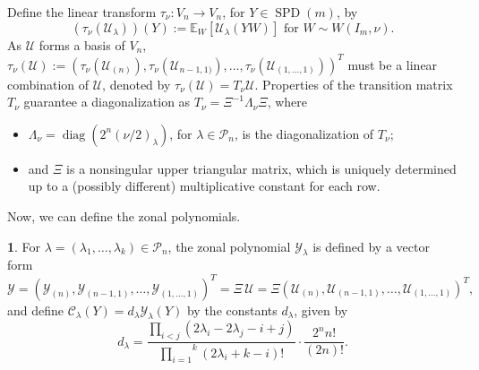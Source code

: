 \documentclass{mathincs}
\numberwithin{equation}{section}
\numberwithin{figure}{section}
\theoremstyle{plain}
\theoremstyle{definition}
\newtheorem{defn}[thm]{\protect\definitionname}
\theoremstyle{remark}
\theoremstyle{plain}
\theoremstyle{definition}
\theoremstyle{plain}
\theoremstyle{plain}
\DeclareMathOperator{\diag}{diag}
\newcommand{\SPD}{\operatorname{SPD}}
\providecommand{\definitionname}{Definition}
\begin{document}
\noindent
Define the linear transform $\tau_{\nu}\colon V_{n}\longrightarrow V_{n}$,
for $Y\in \SPD(m)$, by
\[
  (\tau_{\nu}(\mathcal{U}_{\lambda}))(Y) :=
  \mathbb{E}_{W}[\mathcal{U}_{\lambda}(YW)]\text{ for }W\sim W(I_m,\nu).
\]
As $\mathcal{U}$ forms a basis of $V_{n}$, $\tau_{\nu}(\mathcal{U}):=\left(\tau_{\nu}(\mathcal{U}_{(n)}),\tau_{\nu}(\mathcal{U}_{n-1,1)}),\ldots,\tau_{\nu}(\mathcal{U}_{(1,\ldots,1)})\right)^{T}$
must be a linear combination of $\mathcal{U}$,
denoted by $\tau_{\nu}(\mathcal{U})=T_{\nu}\mathcal{U}$. 
Properties of the transition matrix $T_{\nu}$ guarantee a diagonalization as $T_{\nu}=\Xi^{-1}\Lambda_{\nu}\Xi$, where 
\begin{itemize}
\item $\Lambda_{\nu}=\diag(2^{n}(\nu/2)_{\lambda})$, for $\lambda\in\mathcal{P}_n$, is the diagonalization of $T_\nu$; 
\item and $\Xi$ is a nonsingular upper triangular matrix, which is uniquely
determined up to a (possibly different) multiplicative constant for
each row.
\end{itemize} 
Now, we can define the zonal polynomials.
\begin{defn}
For $\lambda=(\lambda_1,\ldots,\lambda_k)\in\mathcal{P}_{n}$, the zonal polynomial $\mathcal{Y}_{\lambda}$
is defined by a vector form
\begin{equation}\label{eq:ZonalY}
\mathcal{Y}=\left(\mathcal{Y}_{(n)}, \mathcal{Y}_{(n-1,1)}, \ldots, 
\mathcal{Y}_{(1,\ldots,1)}\right)^T
=\Xi\,\mathcal{U}=\Xi\left(\mathcal{U}_{(n)}, \mathcal{U}_{(n-1,1)}, \ldots, \mathcal{U}_{(1,\ldots,1)}
\right)^T\!\!,
\end{equation}
and define $\mathcal{C}_{\lambda}(Y)=d_{\lambda}\mathcal{Y}_{\lambda}(Y)$ by the constants $d_\lambda$, given by
\[
  d_{\lambda}=\frac{\underset{i<j}{\prod}(2\lambda_{i}-2\lambda_{j}-i+j)}{\overset{k}{\underset{i=1}{\prod}}(2\lambda_{i}+k-i)!}
  \cdot\frac{2^{n}n!}{(2n)!}.
\]
\end{defn}
\end{document}
